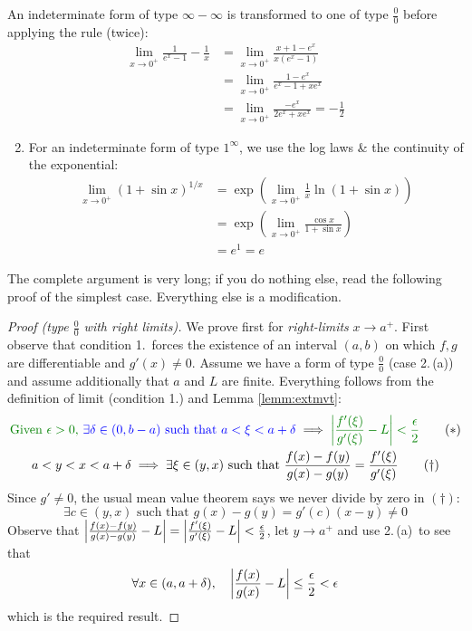 \begin{examples}{}{}
\exstart An indeterminate form of type $\infty-\infty$ is transformed to one of type $\frac 00$ before applying the rule (twice):
  \begin{align*}
  	\lim\limits_{x\to 0^+}\frac 1{e^x-1}-\frac 1x&=\lim\limits_{x\to 0^+}\frac{x+1-e^x}{x(e^x-1)} \tag{type $\frac 00$}\\
  	&=\lim\limits_{x\to 0^+}\frac{1-e^x}{e^x-1+xe^x} \tag{still type $\frac 00$}\\
  	&=\lim\limits_{x\to 0^+}\frac{-e^x}{2e^x+xe^x} =-\frac 12
  \end{align*}
\begin{enumerate}\setcounter{enumi}{1}
 	\item For an indeterminate form of type $1^\infty$, we use the log laws \& the continuity of the exponential:
 	\begin{align*}
 	\lim_{x\to 0^+} (1+\sin x)^{1/x}&=\exp\left(\lim_{x\to 0^+} \frac 1x\ln(1+\sin x)\right) \tag{type $\frac 00$}\\
 	&=\exp\left(\lim_{x\to 0^+} \frac{\cos x}{1+\sin x}\right)\\
 	&=e^1=e
 	\end{align*}
 	\end{enumerate}
\end{examples}


The complete argument is very long; if you do nothing else, read the following proof of the simplest case. Everything else is a modification.

\begin{proof}[Proof (type $\frac 00$ with right limits)]
We prove first for \emph{right-limits} $x\to a^+$. First observe that condition 1.\ forces the existence of an interval $(a,b)$ on which $f,g$ are differentiable and $g'(x)\neq 0$.\smallbreak
Assume we have a form of type $\frac 00$ (case 2.\,(a)) and assume additionally that $a$ and $L$ are finite. Everything follows from the definition of limit (condition 1.) and Lemma \ref{lemm:extmvt}:
\begin{gather*}
\textcolor{Green}{\text{Given $\epsilon>0$, }} \textcolor{blue}{\exists\delta\in(0,b-a)\text{ such that }a<\xi<a+\delta}\implies \textcolor{Green}{\nm{\frac{f'(\xi)}{g'(\xi)}-L}<\frac\epsilon 2}\tag{$\ast$}\\
a<y<x<a+\delta\implies \exists\xi\in(y,x)\text{ such that }\frac{f(x)-f(y)}{g(x)-g(y)}=\frac{f'(\xi)}{g'(\xi)} \tag{$\dag$}
\end{gather*}
Since $g'\neq 0$, the usual mean value theorem says we never divide by zero in $(\dag)$:
\[\exists c\in(y,x)\text{ such that } g(x)-g(y)=g'(c)(x-y)\neq 0\]
Observe that $\left| \frac{f(x)-f(y)}{g(x)-g(y)}-L\right|=\left| \frac{f'(\xi)}{g'(\xi)}-L\right|<\frac\epsilon 2$, let $y\to a^+$ and use 2.\,(a)\ to see that
\[\forall x\in(a,a+\delta),\quad \left| \frac{f(x)}{g(x)}-L\right|\le\frac\epsilon 2<\epsilon\]
which is the required result.
\end{proof}

